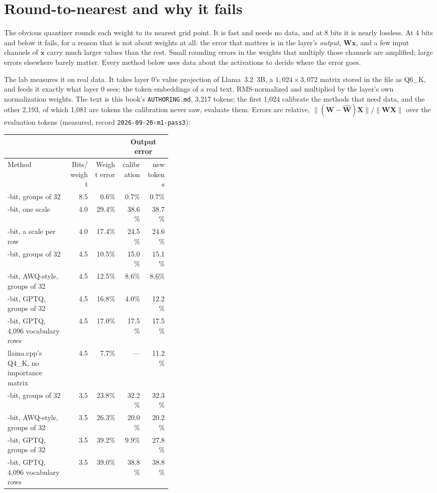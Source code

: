 \section{Round-to-nearest and why it fails}

The obvious quantizer rounds each weight to its nearest grid point. It is fast
and needs no data, and at 8 bits it is nearly lossless. At 4 bits and below it
fails, for a reason that is not about weights at all: the error that matters is
in the layer's \emph{output}, $\mathbf{W}\mathbf{x}$, and a few input channels
of $\mathbf{x}$ carry much larger values than the rest. Small rounding errors
in the weights that multiply those channels are amplified; large errors
elsewhere barely matter. Every method below uses data about the activations to
decide where the error goes.

The lab measures it on real data. It takes layer 0's value projection of
Llama~3.2~3B, a $1{,}024 \times 3{,}072$ matrix stored in the file as Q6\_K,
and feeds it exactly what layer 0 sees: the token embeddings of a real text,
RMS-normalized and multiplied by the layer's own normalization weights. The
text is this book's \texttt{AUTHORING.md}, 3,217 tokens; the first 1,024
calibrate the methods that need data, and the other 2,193, of which 1,081 are
tokens the calibration never saw, evaluate them. Errors are relative,
$\lVert(\mathbf{W} - \hat{\mathbf{W}})\mathbf{X}\rVert / \lVert\mathbf{W}\mathbf{X}\rVert$
over the evaluation tokens (measured, record \texttt{2026-09-26-m1-pass3}):

\begin{center}\small
\begin{tabular}{@{}>{\raggedright\arraybackslash}p{0.38\linewidth}rrrr@{}}
\toprule
 & & & \multicolumn{2}{c}{Output error} \\
\cmidrule(l){4-5}
Method & Bits/weight & Weight error & calibration & new tokens \\
\midrule
8-bit, groups of 32 & 8.5 & 0.6\% & 0.7\% & 0.7\% \\
4-bit, one scale & 4.0 & 29.4\% & 38.6\% & 38.7\% \\
4-bit, a scale per row & 4.0 & 17.4\% & 24.5\% & 24.6\% \\
4-bit, groups of 32 & 4.5 & 10.5\% & 15.0\% & 15.1\% \\
4-bit, AWQ-style, groups of 32 & 4.5 & 12.5\% & 8.6\% & 8.6\% \\
4-bit, GPTQ, groups of 32 & 4.5 & 16.8\% & 4.0\% & 12.2\% \\
4-bit, GPTQ, 4,096 vocabulary rows & 4.5 & 17.0\% & 17.5\% & 17.5\% \\
llama.cpp's Q4\_K, no importance matrix & 4.5 & 7.7\% & --- & 11.2\% \\
3-bit, groups of 32 & 3.5 & 23.8\% & 32.2\% & 32.3\% \\
3-bit, AWQ-style, groups of 32 & 3.5 & 26.3\% & 20.0\% & 20.2\% \\
3-bit, GPTQ, groups of 32 & 3.5 & 39.2\% & 9.9\% & 27.8\% \\
3-bit, GPTQ, 4,096 vocabulary rows & 3.5 & 39.0\% & 38.8\% & 38.8\% \\
\bottomrule
\end{tabular}
\end{center}

